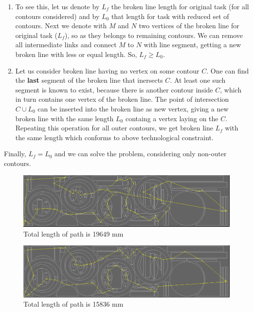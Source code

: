 \documentclass{../download/tPRS2e}
\begin{document}
\begin{enumerate}
    \item{}
To see this, let us denote by
$L_f$ the broken line length for original task
(for all contours considered)
and by 
$L_0$ that length for task with reduced set of contours.
Next we denote with $M$ and $N$
two vertices of the broken line for original task
($L_f$),
so as they belongs to remaining contours.
We can remove all intermediate links and connect 
$M$ to $N$ with line segment,
getting a new broken line with less or equal length.
So, $L_f \ge L_0$.
    \item{}
Let us consider broken line
having no vertex on some contour $C$.
One can find the \textbf{last} segment
of the broken line
that inersects $C$.
At least one such segment is known to exist,
because there is another contour inside $C$,
which in turn contains one vertex of the broken line.
The point of intersection $C \cup L_0$ can be inserted
into the broken line as new vertex,
giving a new broken line with the same length $L_0$
containg a vertex laying on the $C$.
Repeating this operation for all outer contours,
we get broken line $L_f$ with the same length
which conforms to above
technological constraint.
\end{enumerate}

Finally, $L_f = L_0$ and we can solve the problem,
considering only non-outer contours.

\begin{figure}[b]
    \includegraphics{mini-bad.png}
    \caption{Total length of path is 19649 mm}
\end{figure}

\begin{figure}[b]
    \includegraphics{mini-good.png}
    \caption{Total length of path is 15836 mm}
\end{figure}
\end{document}
